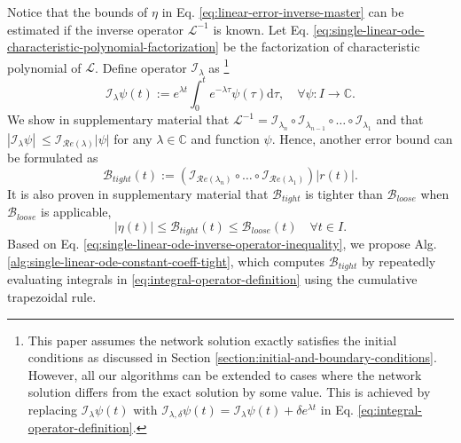 \documentclass[accepted]{uai2023}
\newcommand{\Err}{\eta}
\newcommand{\Bound}{\mathcal{B}}
\renewcommand{\L}{\mathcal{L}}
\newcommand{\I}{\mathcal{I}}
\renewcommand{\Re}[1]{\mathcal{R}e\left(#1\right)}
\begin{document}
    Notice that the bounds of $\Err$ in Eq. \ref{eq:linear-error-inverse-master} can be estimated if the inverse operator $\L^{-1}$ is known. 
    Let Eq. \ref{eq:single-linear-ode-characteristic-polynomial-factorization} be the factorization of characteristic polynomial of $\L$.
    Define operator $\I_{\lambda}$ as \footnote{
        This paper assumes the network solution exactly satisfies the initial conditions as discussed in Section \ref{section:initial-and-boundary-conditions}. 
        However, all our algorithms can be extended to cases where the network solution differs from the exact solution by some value. 
        This is achieved by replacing $\I_\lambda \psi(t)$ with $\I_{\lambda, \delta} \psi(t) = \I_\lambda \psi(t) + \delta e^{\lambda t}$ in Eq. \ref{eq:integral-operator-definition}. 
    }
    \begin{equation} \label{eq:integral-operator-definition}
        \I_\lambda \psi(t) := e^{{\lambda} t} \int_{0}^{t} e^{-{\lambda} \tau} \psi(\tau) \mathrm{d}\tau, \quad \forall \psi : I \to \mathbb{C}.
    \end{equation}
    We show in supplementary material that $\L^{-1} = \I_{\lambda_{n}} \circ \I_{\lambda_{n-1}} \circ \dots \circ \I_{\lambda_1}$ and that $\left|\I_{\lambda} \psi\right| \ \leq \I_{\Re{\lambda}} |\psi|$ for any $\lambda \in \mathbb{C}$ and function $\psi$.
    Hence, another error bound can be formulated as
    \begin{equation} \label{eq:single-linear-ode-inverse-operator-inequality}
        \Bound_{tight}(t) := \left(\I_{\Re{\lambda_{n}}} \circ \dots \circ \I_{\Re{\lambda_1}}\right) |r(t)|.
    \end{equation}
    It is also proven in supplementary material that $\Bound_{tight}$ is tighter than $\Bound_{loose}$ when $\Bound_{loose}$ is applicable,
    \begin{equation} \label{eq:single-linear-ode-tight-and-loose}
        \left|\Err(t)\right| \leq \Bound_{tight}(t) \leq \Bound_{loose}(t) \quad \forall t \in I.
    \end{equation}
    Based on Eq. \ref{eq:single-linear-ode-inverse-operator-inequality}, we propose Alg. \ref{alg:single-linear-ode-constant-coeff-tight}, which computes $\Bound_{tight}$ by repeatedly evaluating integrals in \ref{eq:integral-operator-definition} using the cumulative trapezoidal rule.
\end{document}
